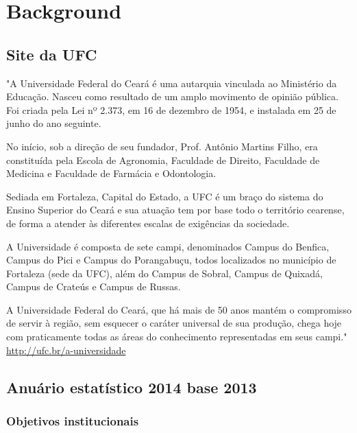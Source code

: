 \documentclass{article}
\begin{document}
\section*{Background}

\subsection*{Site da UFC}

"A Universidade Federal do Ceará é uma autarquia vinculada ao Ministério da Educação. Nasceu como resultado de um amplo movimento de opinião pública. Foi criada pela Lei nº 2.373, em 16 de dezembro de 1954, e instalada em 25 de junho do ano seguinte.

No início, sob a direção de seu fundador, Prof. Antônio Martins Filho, era constituída pela Escola de Agronomia, Faculdade de Direito, Faculdade de Medicina e Faculdade de Farmácia e Odontologia.

Sediada em Fortaleza, Capital do Estado, a UFC é um braço do sistema do Ensino Superior do Ceará e sua atuação tem por base todo o território cearense, de forma a atender às diferentes escalas de exigências da sociedade.

A Universidade é composta de sete campi, denominados Campus do Benfica, Campus do Pici e Campus do Porangabuçu, todos localizados no município de Fortaleza (sede da UFC), além do Campus de Sobral, Campus de Quixadá, Campus de Crateús e Campus de Russas.

A Universidade Federal do Ceará, que há mais de 50 anos mantém o compromisso de servir à região, sem esquecer o caráter universal de sua produção, chega hoje com praticamente todas as áreas do conhecimento representadas em seus campi." \url{http://ufc.br/a-universidade}


\subsection*{Anuário estatístico 2014 base 2013}

\cite{anuario_2014_base_2013}

\subsubsection*{Objetivos institucionais}
\end{document}
